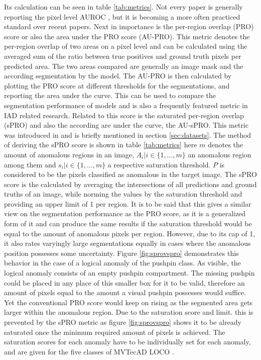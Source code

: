 Its calculation can be seen in 
table \ref{tab:metrics}. Not every paper is generally reporting the pixel level AUROC \cite{csflow2022}, but it is becoming a more often 
practiced standard over recent papers.
Next in importance is the per-region overlap (PRO) score or also the area under the PRO score (AU-PRO). This metric denotes the per-region overlap of two areas 
on a pixel level and can be calculated using the averaged sum of the ratio between true positives and ground truth pixels per predicted area. The two areas 
compared are generally an image mask and the according segmentation by the model. The AU-PRO is then calculated by plotting the PRO score 
at different thresholds for the segmentations, and reporting the area under the curve. This can be 
used to compare the segmentation performance of models and is also a frequently featured metric in IAD related research. 
Related to this score is the saturated per-region overlap (sPRO) and also the according are under the curve, the AU-sPRO. This metric was 
introduced in \cite{LOCODentsAndScratchesBergmann2022} and is briefly mentioned in section \ref{sec:datasets}. The method of deriving the sPRO 
score is shown in table \ref{tab:metrics} here $m$ denotes the amount of anomalous regions in an image, $A_i | i \in \{1, ... , m\}$ an anomalous 
region among them and $s_i | i \in \{1, ... , m\}$ a respective saturation threshold. $P$ is considered to be the pixels classified as anomalous 
in the target image. The sPRO score is the calculated by averaging the intersections of all predictions and ground truths of an image, 
while norming the values by the saturation threshold and providing an upper limit of 1 per region. It is to be said that this gives a similar 
view on the segmentation performance as the PRO score, as it is a generalized form of it and can produce the same results if the saturation 
threshold would be equal to the amount of anomalous pixels per region. However, due to its cap of 1, it also rates varyingly large segmentations equally in cases 
where the anomalous position possesses some uncertainty. Figure \ref{fig:sprovspro} demonstrates this behavior in the case of a logical anomaly of the pushpin class. 
As visible, the logical anomaly consists of an empty pushpin compartment. The missing pushpin could be placed in any place of this smaller 
box for it to be valid, therefore an amount of pixels equal to the amount a visual pushpin possesses would suffice. Yet the conventional PRO score 
would keep on rising as the segmented area gets larger within the anomalous region. Due to the saturation score and limit. this is prevented 
by the sPRO metric as figure \ref{fig:sprovspro} shows it to be already saturated once the minimum required amount of pixels is achieved. The saturation 
scores for each anomaly have to be individually set for each anomaly, and are given for the five classes of MVTecAD LOCO \cite{LOCODentsAndScratchesBergmann2022}.

